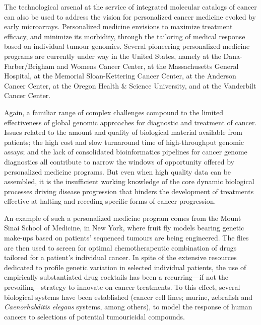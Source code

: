 
The technological arsenal at the service of integrated molecular catalogs of
cancer can also be used to address the vision for personalized cancer medicine
evoked by early microarrays.\cite{sander_genomic_2000}
Personalized medicine envisions to maximize treatment efficacy, and minimize its
morbidity, through the tailoring of medical response based on individual tumour
genomics.  Several pioneering personalized medicine programs are currently under
way in the United States, namely at the Dana-Farber/Brigham and Womens Cancer
Center, at the Massachusetts General Hospital, at the Memorial Sloan-Kettering
Cancer Center, at the  Anderson Cancer Center, at the Oregon
Health \& Science University, and at the Vanderbilt Cancer
Center.\cite{macconaill_clinical_2011}

Again, a familiar range of complex challenges compound to the limited
effectiveness of global genomic approaches for diagnostic and treatment of
cancer.  Issues related to the amount and quality of biological material
available from patients; the high cost and slow turnaround time of
high-throughput genomic assays; and the lack of consolidated bioinformatics
pipelines for cancer genome diagnostics all contribute to narrow the windows of
opportunity offered by personalized medicine programs.  But even when high
quality data can be assembled, it is the insufficient working knowledge of the
core dynamic biological processes driving disease progression that hinders the
development of treatments effective at halting and receding specific forms of
cancer progression.

An example of such a personalized medicine program comes from the Mount Sinai
School of Medicine, in New York, where fruit fly models bearing genetic make-ups
based on patients' sequenced tumours are being engineered.  The flies are then
used to screen for optimal chemotherapeutic combination of drugs tailored for a
patient's individual cancer.\cite{warren_theres_2013} In spite of the extensive
resources dedicated to profile genetic variation in selected individual
patients, the use of empirically substantiated drug cocktails has been a
recurring---if not the prevailing---strategy to innovate on cancer treatments.
To this effect, several biological systems have been established (cancer cell
lines; murine, zebrafish and \emph{Caenorhabditis elegans} systems, among
others), to model the response of human cancers to selections of potential
tumouricidal compounds.\cite{sharma_cell_2010,heyer_non-germline_2010,potts_cell_2011,gonzalez_drosophila_2013,white_zebrafish_2013}

